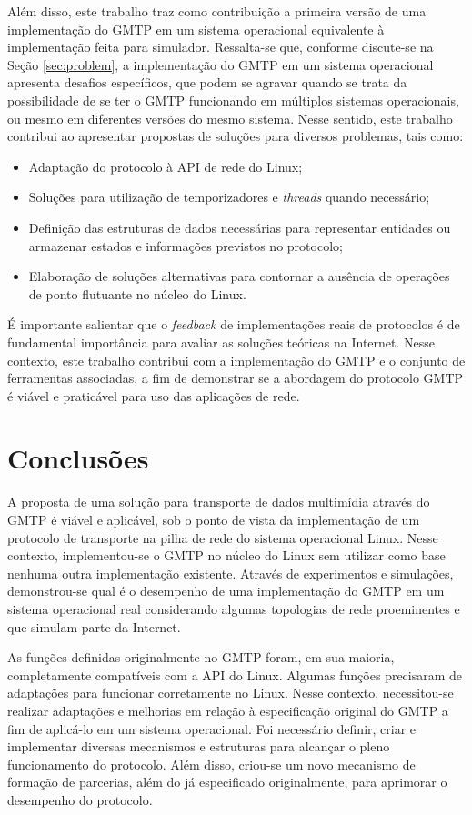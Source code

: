Além disso, este trabalho traz como contribuição a primeira versão de uma implementação do GMTP em um sistema operacional equivalente à implementação feita para simulador.
Ressalta-se que, conforme discute-se na Seção \ref{sec:problem}, a implementação do GMTP em um sistema operacional apresenta desafios específicos, que podem se agravar quando se trata da possibilidade de se ter o GMTP funcionando em múltiplos sistemas operacionais, ou mesmo em diferentes versões do mesmo sistema.
Nesse sentido, este trabalho contribui ao apresentar propostas de soluções para diversos problemas, tais como:
\begin{itemize}
	\item Adaptação do protocolo à API de rede do Linux;
	\item Soluções para utilização de temporizadores e \textit{threads} quando necessário;
	\item Definição das estruturas de dados necessárias para representar entidades ou armazenar estados e informações previstos no protocolo;
	\item Elaboração de soluções alternativas para contornar a ausência de operações de ponto flutuante no núcleo do Linux.
\end{itemize}

É importante salientar que o \textit{feedback} de implementações reais de protocolos é de fundamental importância para avaliar as soluções teóricas na Internet.
Nesse contexto, este trabalho contribui com a implementação do GMTP e o conjunto de ferramentas associadas, a fim de demonstrar se a abordagem do protocolo GMTP é viável e praticável para uso das aplicações de rede.

% 
% 
% 
%
\section{Conclusões}
\label{sec:conclusoes}

A proposta de uma solução para transporte de dados multimídia através do GMTP é viável e aplicável, sob o ponto de vista da implementação de um protocolo de transporte na pilha de rede do sistema operacional Linux.
Nesse contexto, implementou-se o GMTP no núcleo do Linux sem utilizar como base nenhuma outra implementação existente.
Através de experimentos e simulações, demonstrou-se qual é o desempenho de uma implementação do GMTP em um sistema operacional real considerando algumas topologias de rede proeminentes e que simulam parte da Internet.

As funções definidas originalmente no GMTP foram, em sua maioria, completamente compatíveis com a API do Linux. 
Algumas funções precisaram de adaptações para funcionar corretamente no Linux.
Nesse contexto, necessitou-se realizar adaptações e melhorias em relação à especificação original do GMTP a fim de aplicá-lo em um sistema operacional. Foi necessário definir, criar e implementar diversas mecanismos e estruturas para alcançar o pleno funcionamento do protocolo. Além disso, criou-se um novo mecanismo de formação de parcerias, além do já especificado originalmente, para aprimorar o desempenho do protocolo.

